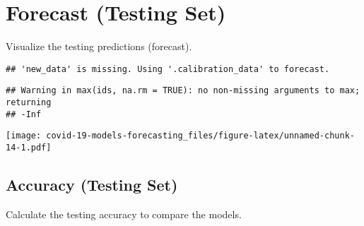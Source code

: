 \documentclass[
]{article}
\newenvironment{Shaded}{\begin{snugshade}}{\end{snugshade}}
\newcommand{\DataTypeTok}[1]{\textcolor[rgb]{0.13,0.29,0.53}{#1}}
\newcommand{\KeywordTok}[1]{\textcolor[rgb]{0.13,0.29,0.53}{\textbf{#1}}}
\newcommand{\NormalTok}[1]{#1}
\newcommand{\OperatorTok}[1]{\textcolor[rgb]{0.81,0.36,0.00}{\textbf{#1}}}
\newcommand{\OtherTok}[1]{\textcolor[rgb]{0.56,0.35,0.01}{#1}}
\newcommand{\StringTok}[1]{\textcolor[rgb]{0.31,0.60,0.02}{#1}}
\begin{document}
\hypertarget{forecast-testing-set}{%
\section{Forecast (Testing Set)}\label{forecast-testing-set}}

Visualize the testing predictions (forecast).

\begin{Shaded}
\end{Shaded}

\begin{verbatim}
## 'new_data' is missing. Using '.calibration_data' to forecast.
\end{verbatim}

\begin{verbatim}
## Warning in max(ids, na.rm = TRUE): no non-missing arguments to max; returning
## -Inf
\end{verbatim}

\texttt{[image: covid-19-models-forecasting\_files/figure-latex/unnamed-chunk-14-1.pdf]}

\hypertarget{accuracy-testing-set}{%
\subsection{Accuracy (Testing Set)}\label{accuracy-testing-set}}

Calculate the testing accuracy to compare the models.

\begin{Shaded}
\end{Shaded}
\end{document}
